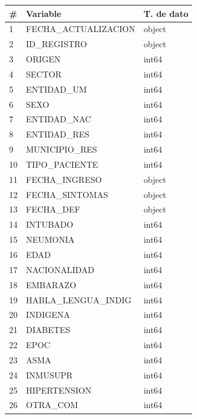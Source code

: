 \begin{table}[h]
\resizebox{7.5cm}{!} {

\begin{tabular}{|l|l|l|}
\hline
\# & Variable                & T. de dato \\ \hline
1  & FECHA\_ACTUALIZACION    & object     \\ \hline
2  & ID\_REGISTRO            & object     \\ \hline
3  & ORIGEN                  & int64      \\ \hline
4  & SECTOR                  & int64      \\ \hline
5  & ENTIDAD\_UM             & int64      \\ \hline
6  & SEXO                    & int64      \\ \hline
7  & ENTIDAD\_NAC            & int64      \\ \hline
8  & ENTIDAD\_RES            & int64      \\ \hline
9  & MUNICIPIO\_RES          & int64      \\ \hline
10 & TIPO\_PACIENTE          & int64      \\ \hline
11 & FECHA\_INGRESO          & object     \\ \hline
12 & FECHA\_SINTOMAS         & object     \\ \hline
13 & FECHA\_DEF              & object     \\ \hline
14 & INTUBADO                & int64      \\ \hline
15 & NEUMONIA                & int64      \\ \hline
16 & EDAD                    & int64      \\ \hline
17 & NACIONALIDAD            & int64      \\ \hline
18 & EMBARAZO                & int64      \\ \hline
19 & HABLA\_LENGUA\_INDIG    & int64      \\ \hline
20 & INDIGENA                & int64      \\ \hline
21 & DIABETES                & int64      \\ \hline
22 & EPOC                    & int64      \\ \hline
23 & ASMA                    & int64      \\ \hline
24 & INMUSUPR                & int64      \\ \hline
25 & HIPERTENSION            & int64      \\ \hline
26 & OTRA\_COM               & int64      \\ \hline

\end{tabular}}
\end{table}

